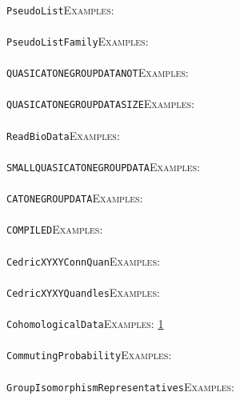 \documentclass[a4paper,11pt]{report}
\begin{document}
{{ \\
 \texttt{PseudoList}{\nobreakspace}{\nobreakspace}{\nobreakspace}{\nobreakspace}\textsc{Examples:} \\
 \\
 \texttt{PseudoListFamily}{\nobreakspace}{\nobreakspace}{\nobreakspace}{\nobreakspace}\textsc{Examples:} \\
 \\
 \texttt{QUASICATONEGROUP{\textunderscore}DATA{\textunderscore}NOT}{\nobreakspace}{\nobreakspace}{\nobreakspace}{\nobreakspace}\textsc{Examples:} \\
 \\
 \texttt{QUASICATONEGROUP{\textunderscore}DATA{\textunderscore}SIZE}{\nobreakspace}{\nobreakspace}{\nobreakspace}{\nobreakspace}\textsc{Examples:} \\
 \\
 \texttt{ReadBioData}{\nobreakspace}{\nobreakspace}{\nobreakspace}{\nobreakspace}\textsc{Examples:} \\
 \\
 \texttt{SMALLQUASICATONEGROUP{\textunderscore}DATA}{\nobreakspace}{\nobreakspace}{\nobreakspace}{\nobreakspace}\textsc{Examples:} \\
 \\
 \texttt{CATONEGROUP{\textunderscore}DATA}{\nobreakspace}{\nobreakspace}{\nobreakspace}{\nobreakspace}\textsc{Examples:} \\
 \\
 \texttt{COMPILED}{\nobreakspace}{\nobreakspace}{\nobreakspace}{\nobreakspace}\textsc{Examples:} \\
 \\
 \texttt{Cedric{\textunderscore}XYXYConnQuan}{\nobreakspace}{\nobreakspace}{\nobreakspace}{\nobreakspace}\textsc{Examples:} \\
 \\
 \texttt{Cedric{\textunderscore}XYXYQuandles}{\nobreakspace}{\nobreakspace}{\nobreakspace}{\nobreakspace}\textsc{Examples:} \\
 \\
 \texttt{CohomologicalData}{\nobreakspace}{\nobreakspace}{\nobreakspace}{\nobreakspace}\textsc{Examples:} \href{tutorial/chap7.html} {1}{\nobreakspace} \\
 \\
 \texttt{CommutingProbability}{\nobreakspace}{\nobreakspace}{\nobreakspace}{\nobreakspace}\textsc{Examples:} \\
 \\
 \texttt{GroupIsomorphismRepresentatives}{\nobreakspace}{\nobreakspace}{\nobreakspace}{\nobreakspace}\textsc{Examples:} \\
}}
\end{document}
